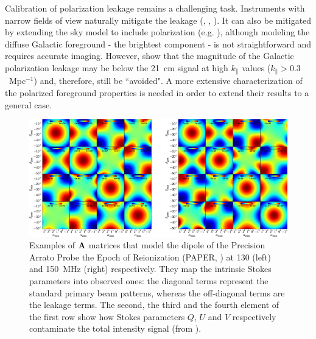\begin{itemize}
Calibration of polarization leakage remains a challenging task. Instruments with narrow fields of view naturally mitigate the leakage (\cite{asad15}, \cite{asad16}, \cite{asad18}). It can also be mitigated by extending the sky model to include polarization (e.g. \cite{geil11}), although modeling the diffuse Galactic foreground - the brightest component - is not straightforward and requires accurate imaging. However, \cite{nunhokee17} show that the magnitude of the Galactic polarization leakage may be below the 21~cm signal at high $k_\parallel$ values ($k_\parallel > 0.3$~Mpc$^{-1}$) and, therefore, still be ``avoided". A more extensive characterization of the polarized foreground properties is needed in order to extend their results to a general case.
\begin{figure}[]
\begin{center}
\includegraphics[width=1.\textwidth]{Bernardi/polarized_beam_leakage}
\end{center}
\caption{Examples of ${\bf A}$ matrices that model the dipole of the Precision Arrato Probe the Epoch of Reionization (PAPER, \cite{parsons10}) at 130 (left) and 150~MHz (right) respectively. They map the intrinsic Stokes parameters into observed ones: the diagonal terms represent the standard primary beam patterns, whereas the off-diagonal terms are the leakage terms. The second, the third and the fourth element of the first row show how Stokes parameters $Q$, $U$ and $V$ respectively contaminate the total intensity signal (from \cite{nunhokee17}).}
\label{fig:fig4}
\end{figure}




\end{itemize}
